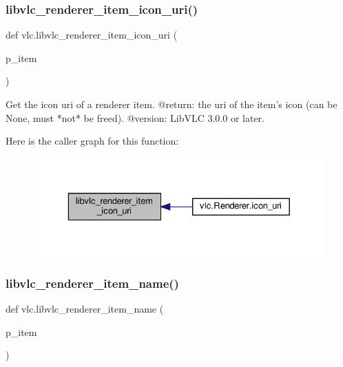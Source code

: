 \subsubsection{\texorpdfstring{libvlc\+\_\+renderer\+\_\+item\+\_\+icon\+\_\+uri()}{libvlc\_renderer\_item\_icon\_uri()}}
{\footnotesize\ttfamily def vlc.\+libvlc\+\_\+renderer\+\_\+item\+\_\+icon\+\_\+uri (\begin{DoxyParamCaption}\item[{}]{p\+\_\+item }\end{DoxyParamCaption})}

\begin{DoxyVerb}Get the icon uri of a renderer item.
@return: the uri of the item's icon (can be None, must *not* be freed).
@version: LibVLC 3.0.0 or later.
\end{DoxyVerb}
 Here is the caller graph for this function\+:
\nopagebreak
\begin{figure}[H]
\begin{center}
\leavevmode
\includegraphics[width=329pt]{namespacevlc_a52e4801a24e87686f2503e8314b0faf9_icgraph}
\end{center}
\end{figure}
\mbox{\label{namespacevlc_af07b197185f16792044c2e60d04dc412}} 
\subsubsection{\texorpdfstring{libvlc\+\_\+renderer\+\_\+item\+\_\+name()}{libvlc\_renderer\_item\_name()}}
{\footnotesize\ttfamily def vlc.\+libvlc\+\_\+renderer\+\_\+item\+\_\+name (\begin{DoxyParamCaption}\item[{}]{p\+\_\+item }\end{DoxyParamCaption})}

